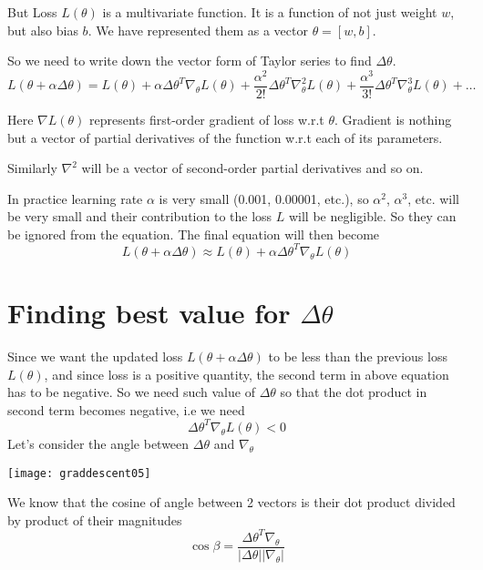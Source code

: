 But Loss $L(\theta)$ is a multivariate function. It is a function of not just weight $w$, but also bias $b$. We have represented them as a vector $\theta = [w, b]$.

So we need to write down the vector form of Taylor series to find $\Delta  \theta$.
\begin{equation}
L(\theta+\alpha \Delta \theta)=L(\theta)+\alpha \Delta \theta^{T} \nabla_{\theta} L(\theta)+\frac{\alpha^{2}}{2 !} \Delta \theta^{T} \nabla_{\theta}^{2} L(\theta)+\frac{\alpha^{3}}{3 !} \Delta \theta^{T} \nabla_{\theta}^{3} L(\theta)+\ldots
\end{equation}


Here $\nabla  L(\theta)$ represents first-order gradient of loss w.r.t $\theta$.
Gradient is nothing but a vector of partial derivatives of the function w.r.t each of its parameters.

Similarly $\nabla^2$ will be a vector of second-order partial derivatives and so on.

In practice learning rate $\alpha$  is very small (0.001, 0.00001, etc.), so $\alpha^2$, $\alpha^3$, etc. will be very small and their contribution to the loss $L$ will be negligible.
So they can be ignored from the equation.
The final equation will then become
\begin{equation}
L(\theta+\alpha \Delta \theta) \approx L(\theta)+\alpha \Delta \theta^{T} \nabla_{\theta} L(\theta)
\end{equation}


\section{Finding best value for $\Delta  \theta$}

Since we want the updated loss $L(\theta + \alpha \Delta  \theta)$ to be less than the previous loss $L(\theta)$, and since loss is a positive quantity, the second term in above equation has to be negative.
So we need such value of $\Delta  \theta$ so that the dot product in second term becomes negative, i.e we need 
\begin{equation}
\Delta \theta^{T} \nabla_{\theta} L(\theta)<0
\end{equation}
Let's consider the angle between $\Delta \theta$ and $\nabla_\theta$
\begin{marginfigure}
\texttt{[image: graddescent05]}
\end{marginfigure}




We know that the cosine of angle between 2 vectors is their dot product divided by product of their magnitudes
\begin{equation}
\cos \beta=\frac{\Delta \theta^{T} \nabla_{\theta}}{|\Delta \theta|\left|\nabla_{\theta}\right|}
\end{equation}

